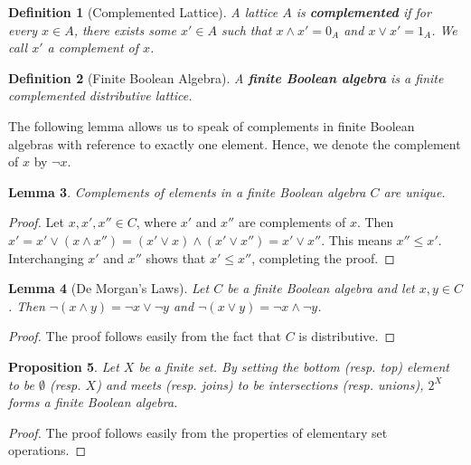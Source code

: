 \documentclass{article}
\newtheorem{proposition}{Proposition}[section]
\newtheorem{lemma}[proposition]{Lemma}
\newtheorem{definition}[proposition]{Definition}
\numberwithin{equation}{section}
\newcommand{\meet}{\wedge}
\newcommand{\join}{\vee}
\begin{document}
\begin{definition}[Complemented Lattice]
A lattice $A$ is \textbf{complemented} if for every $x \in A$, there exists some $x' \in A$ such that $x \meet x' = 0_A$ and $x \join x' = 1_A$. We call $x'$ a complement of $x$. 
\end{definition}

\begin{definition}[Finite Boolean Algebra]
A \textbf{finite Boolean algebra} is a finite complemented distributive lattice.
\end{definition}

The following lemma allows us to speak of complements in finite Boolean algebras with reference to exactly one element. Hence, we denote the complement of $x$ by $\neg x$.

\begin{lemma} \label{lem:finite-ba-complements-are-unique}
Complements of elements in a finite Boolean algebra $C$ are unique. 
\end{lemma}

\begin{proof}
Let $x, x', x'' \in C$, where $x'$ and $x''$ are complements of $x$. Then $x' = x' \join (x \meet x'') = (x' \join x) \meet (x' \join x'') = x' \join x''$. This means $x'' \leq x'$. Interchanging $x'$ and $x''$ shows that $x' \leq x''$, completing the proof. 
\end{proof}

\begin{lemma}[De Morgan's Laws] \label{lem:de-morgans-laws}
Let $C$ be a finite Boolean algebra and let $x, y \in C$. Then $\neg (x \meet y) = \neg x \join \neg y$ and $\neg (x \join y) = \neg x \meet \neg y$.
\end{lemma}

\begin{proof}
The proof follows easily from the fact that $C$ is distributive.
\end{proof}

\begin{proposition} \label{prop:powset-is-bool-alg}
Let $X$ be a finite set. By setting the bottom (resp. top) element to be $\emptyset$ (resp. $X$) and meets (resp. joins) to be intersections (resp. unions), $2^X$ forms a finite Boolean algebra.
\end{proposition}

\begin{proof}
The proof follows easily from the properties of elementary set operations. 
\end{proof}
\end{document}
